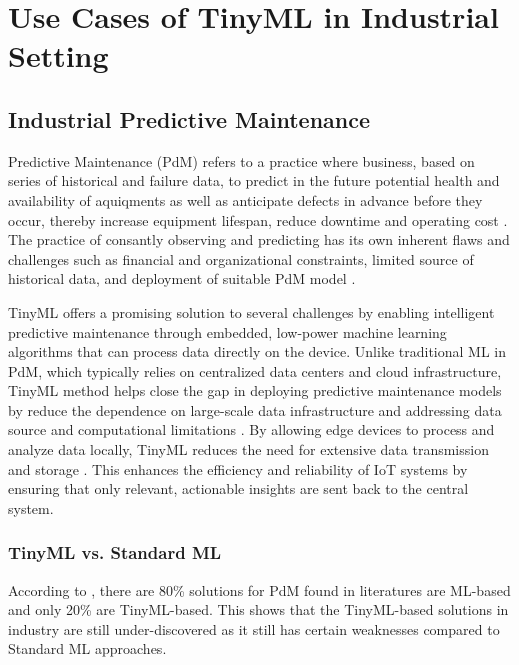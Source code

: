 \documentclass[twocolumn]{article}
\begin{document}
\section{Use Cases of TinyML in Industrial Setting}
\label{use_cases}

\subsection{Industrial Predictive Maintenance}

Predictive Maintenance (PdM) refers to a practice where business, based on series of historical and failure data, to predict in the future potential health and availability of aquiqments as well as anticipate defects in advance before they occur, thereby increase equipment lifespan, reduce downtime and operating cost \cite{ooko_application_2024}. The practice of consantly observing and predicting has its own inherent flaws and challenges such as financial and organizational constraints, limited source of historical data, and deployment of suitable PdM model \cite{zonta_predictive_2020}. 

TinyML offers a promising solution to several challenges by enabling intelligent predictive maintenance through embedded, low-power machine learning algorithms that can process data directly on the device. Unlike traditional ML in PdM, which typically relies on centralized data centers and cloud infrastructure, TinyML method helps close the gap in deploying predictive maintenance models by reduce the dependence on large-scale data infrastructure and addressing data source and computational limitations \cite{abadade_comprehensive_2023}. By allowing edge devices to process and analyze data locally, TinyML reduces the need for extensive data transmission and storage \cite{ooko_tinyml_2021}. This enhances the efficiency and reliability of IoT systems by ensuring that only relevant, actionable insights are sent back to the central system.

\subsubsection{TinyML vs. Standard ML}

According to \cite{achouch_predictive_2022,zonta_predictive_2020}, there are 80\% solutions for PdM found in literatures are ML-based and only 20\% are TinyML-based. This shows that the TinyML-based solutions in industry are still under-discovered as it still has certain weaknesses compared to Standard ML approaches.
\end{document}
